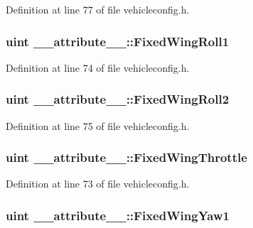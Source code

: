 \-Definition at line 77 of file vehicleconfig.\-h.

\hypertarget{group___config_plugin_ga674f11a566247fc5041091e940c5d679}{
\subsubsection[{\-Fixed\-Wing\-Roll1}]{\setlength{\rightskip}{0pt plus 5cm}uint {\bf \-\_\-\-\_\-attribute\-\_\-\-\_\-\-::\-Fixed\-Wing\-Roll1}}}\label{group___config_plugin_ga674f11a566247fc5041091e940c5d679}


\-Definition at line 74 of file vehicleconfig.\-h.

\hypertarget{group___config_plugin_ga1d932ff664060c5dd74bb8ec48b4d8ff}{
\subsubsection[{\-Fixed\-Wing\-Roll2}]{\setlength{\rightskip}{0pt plus 5cm}uint {\bf \-\_\-\-\_\-attribute\-\_\-\-\_\-\-::\-Fixed\-Wing\-Roll2}}}\label{group___config_plugin_ga1d932ff664060c5dd74bb8ec48b4d8ff}


\-Definition at line 75 of file vehicleconfig.\-h.

\hypertarget{group___config_plugin_ga2c5e7e1c1622df1735c63b2a700b1f30}{
\subsubsection[{\-Fixed\-Wing\-Throttle}]{\setlength{\rightskip}{0pt plus 5cm}uint {\bf \-\_\-\-\_\-attribute\-\_\-\-\_\-\-::\-Fixed\-Wing\-Throttle}}}\label{group___config_plugin_ga2c5e7e1c1622df1735c63b2a700b1f30}


\-Definition at line 73 of file vehicleconfig.\-h.

\hypertarget{group___config_plugin_ga8282dac2550d491034ca0e0fa8f09c0d}{
\subsubsection[{\-Fixed\-Wing\-Yaw1}]{\setlength{\rightskip}{0pt plus 5cm}uint {\bf \-\_\-\-\_\-attribute\-\_\-\-\_\-\-::\-Fixed\-Wing\-Yaw1}}}\label{group___config_plugin_ga8282dac2550d491034ca0e0fa8f09c0d}


